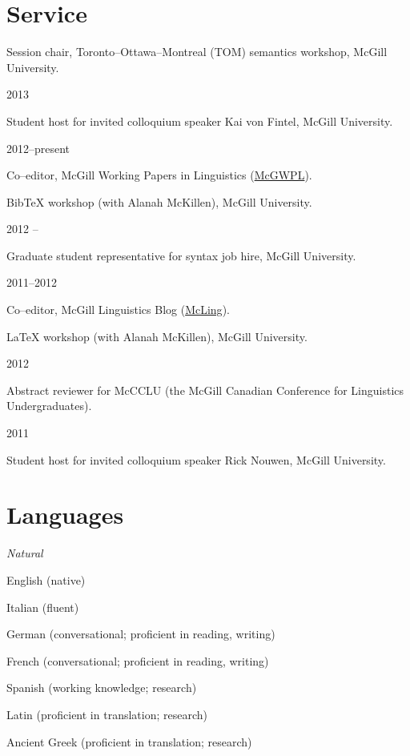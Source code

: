 \documentclass[11pt,letterpaper]{article}
\newcommand{\cvitem}[2]{%
  \begin{minipage}[t]{0.24\textwidth}
    #1 %
  \end{minipage}
  \hfill
  \begin{minipage}[t]{0.74\textwidth}
    #2 %
  \end{minipage}
}
\renewenvironment{itemize}{%
  \begin{list}{}{%
    \setlength{\itemsep}{0.5em}
    \setlength{\leftmargin}{0em}
  }
}{%
  \end{list}
}
\begin{document}
\section*{Service}

\cvitem{}{Session chair, Toronto--Ottawa--Montreal
(TOM) semantics workshop, McGill University.}

\cvitem{2013 \shortmonthname[1]}{Student host for invited colloquium speaker
Kai von Fintel, McGill University.}

\cvitem{2012--present}{Co--editor, McGill Working Papers in Linguistics
(\href{http://www.mcgill.ca/mcgwpl/}{McGWPL}).}

\cvitem{}{Bib\TeX{} workshop (with Alanah McKillen),
McGill University.}

\cvitem{2012 \shortmonthname[5]--\shortmonthname[6]}{Graduate student
representative for syntax job hire, McGill University.}

\cvitem{2011--2012}{Co--editor, McGill Linguistics Blog
(\href{https://blogs.mcgill.ca/mcling/}{McLing}).}

\cvitem{}{\LaTeX{} workshop (with Alanah McKillen),
McGill University.}

\cvitem{2012 \shortmonthname[1]}{Abstract reviewer for McCCLU (the McGill
Canadian Conference for Linguistics Undergraduates).}

\cvitem{2011 \shortmonthname[12]}{Student host for invited colloquium speaker
Rick Nouwen, McGill University.}



\section*{Languages}

\cvitem{\textit{Natural}}{%
  \begin{itemize}
    \item English \hfill (native)
    \item Italian \hfill (fluent)
    \item German \hfill (conversational; proficient in reading, writing)
    \item French \hfill (conversational; proficient in reading, writing)
    \item Spanish \hfill (working knowledge; research)
    \item Latin \hfill (proficient in translation; research)
    \item Ancient Greek \hfill (proficient in translation; research)
  \end{itemize}
}
\end{document}
